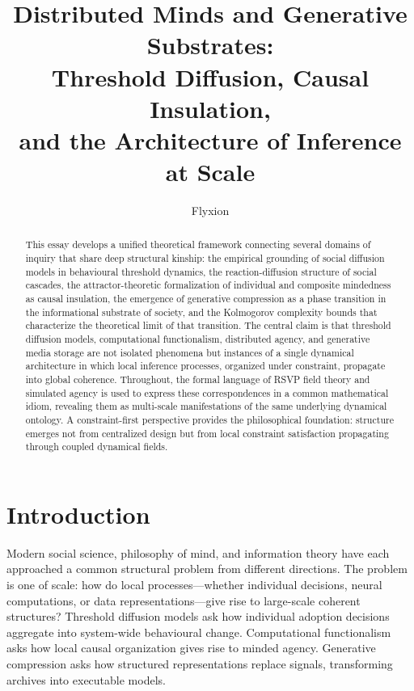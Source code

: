 \documentclass[12pt,a4paper]{article}
\title{\textbf{Distributed Minds and Generative Substrates:\\
Threshold Diffusion, Causal Insulation,\\
and the Architecture of Inference at Scale}}
\author{Flyxion}
\date{}
\theoremstyle{plain}
\theoremstyle{definition}
\begin{document}
\maketitle

\begin{abstract}
This essay develops a unified theoretical framework connecting several domains of inquiry that share deep structural kinship: the empirical grounding of social diffusion models in behavioural threshold dynamics, the reaction-diffusion structure of social cascades, the attractor-theoretic formalization of individual and composite mindedness as causal insulation, the emergence of generative compression as a phase transition in the informational substrate of society, and the Kolmogorov complexity bounds that characterize the theoretical limit of that transition. The central claim is that threshold diffusion models, computational functionalism, distributed agency, and generative media storage are not isolated phenomena but instances of a single dynamical architecture in which local inference processes, organized under constraint, propagate into global coherence. Throughout, the formal language of RSVP field theory and simulated agency is used to express these correspondences in a common mathematical idiom, revealing them as multi-scale manifestations of the same underlying dynamical ontology. A constraint-first perspective provides the philosophical foundation: structure emerges not from centralized design but from local constraint satisfaction propagating through coupled dynamical fields.
\end{abstract}

\newpage
\tableofcontents

\newpage

\section{Introduction}

Modern social science, philosophy of mind, and information theory have each approached a common structural problem from different directions. The problem is one of scale: how do local processes—whether individual decisions, neural computations, or data representations—give rise to large-scale coherent structures? Threshold diffusion models ask how individual adoption decisions aggregate into system-wide behavioural change. Computational functionalism asks how local causal organization gives rise to minded agency. Generative compression asks how structured representations replace signals, transforming archives into executable models.
\end{document}
